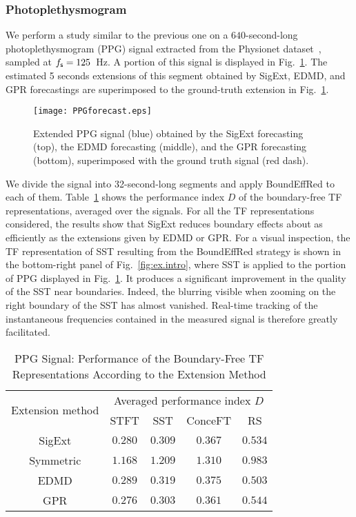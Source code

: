 \subsubsection{Photoplethysmogram}
\label{ssse:ppg}
We perform a study similar to the previous one on a $640$-second-long photoplethysmogram (PPG) signal extracted from the Physionet dataset~\cite{Pimentel17toward, Goldberger00physiobank}, sampled at $f_{\mathsf s}=125$~Hz. A portion of this signal is displayed in Fig.~\ref{fig:ppg}. The estimated 5 seconds extensions of this segment obtained by {\sf SigExt}, EDMD, and GPR forecastings  are superimposed to the ground-truth extension in Fig.~\ref{fig:ppg}.

\begin{figure}
\texttt{[image: PPGforecast.eps]}
\caption{Extended PPG signal (blue) obtained by the {\sf SigExt} forecasting (top), the EDMD forecasting (middle), and the GPR forecasting (bottom), superimposed with the ground truth signal (red dash).}
\label{fig:ppg}
\end{figure}

We divide the signal into 32-second-long segments and apply {\sf BoundEffRed} to each of them. Table~\ref{tab:otd.ppg} shows the performance index $D$ of the boundary-free TF representations, averaged over the signals. For all the TF representations considered, the results show that {\sf SigExt} reduces boundary effects about as efficiently as the extensions given by EDMD or GPR. For a visual inspection, the TF representation of SST resulting from the {\sf BoundEffRed} strategy is shown in the bottom-right panel of Fig.~\ref{fig:ex.intro}, where SST is applied to the portion of PPG displayed in Fig.~\ref{fig:ppg}. It produces a significant improvement in the quality of the SST near boundaries. Indeed, the blurring visible when zooming on the right boundary of the SST has almost vanished. Real-time tracking of the instantaneous frequencies contained in the measured signal is therefore greatly facilitated.

\begin{table}
\centering
\caption{PPG Signal: Performance of the Boundary-Free TF Representations According to the Extension Method}
\begin{tabular}{|c||c|c|c|c|}
  \hline
   \multirow{2}{40pt}{\centering Extension method} & \multicolumn{4}{c|}{Averaged performance index $D$} \\
   \cline{2-5}
      & STFT & SST & ConceFT & RS\\
   \hhline{|=#=|=|=|=|}
   {\sf SigExt} & $0.280$ & $0.309$ & $0.367$ & $0.534$ \\
   \hline
   Symmetric & $1.168$ & $1.209$ & $1.310$ & $0.983$ \\
   \hline
   EDMD & $0.289$ & $0.319$ & $0.375$ & $0.503$ \\
   \hline
   GPR & $0.276$ & $0.303$ & $0.361$ & $0.544$ \\
   \hline
\end{tabular}
\label{tab:otd.ppg}
\end{table}

